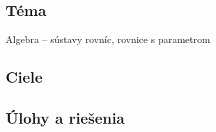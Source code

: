 
\subsection*{Téma}
Algebra -- sústavy rovníc, rovnice s parametrom

\subsection*{Ciele}

\subsection*{Úlohy a riešenia} 












%

%